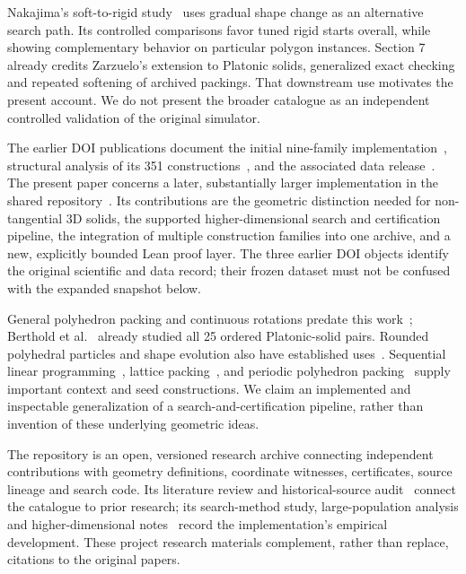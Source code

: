 \documentclass[11pt,a4paper]{article}
\begin{document}
Nakajima's soft-to-rigid study~\cite{nakajima2026} uses gradual shape change as an alternative search path. Its controlled comparisons favor tuned rigid starts overall, while showing complementary behavior on particular polygon instances. Section 7 already credits Zarzuelo's extension to Platonic solids, generalized exact checking and repeated softening of archived packings. That downstream use motivates the present account. We do not present the broader catalogue as an independent controlled validation of the original simulator.

The earlier DOI publications document the initial nine-family implementation~\cite{zarzueloMethods}, structural analysis of its 351 constructions~\cite{zarzueloPatterns}, and the associated data release~\cite{zarzueloData}. The present paper concerns a later, substantially larger implementation in the shared repository~\cite{archive}. Its contributions are the geometric distinction needed for non-tangential 3D solids, the supported higher-dimensional search and certification pipeline, the integration of multiple construction families into one archive, and a new, explicitly bounded Lean proof layer. The three earlier DOI objects identify the original scientific and data record; their frozen dataset must not be confused with the expanded snapshot below.

General polyhedron packing and continuous rotations predate this work~\cite{romanova2018}; Berthold et al.~\cite{berthold2026} already studied all 25 ordered Platonic-solid pairs. Rounded polyhedral particles and shape evolution also have established uses~\cite{jin2015}. Sequential linear programming~\cite{torquato2010}, lattice packing~\cite{betke2000}, and periodic polyhedron packing~\cite{torquato2009} supply important context and seed constructions. We claim an implemented and inspectable generalization of a search-and-certification pipeline, rather than invention of these underlying geometric ideas.

The repository is an open, versioned research archive connecting independent contributions with geometry definitions, coordinate witnesses, certificates, source lineage and search code. Its literature review and historical-source audit~\cite{repoRelated,repoAudit} connect the catalogue to prior research; its search-method study, large-population analysis and higher-dimensional notes~\cite{repoSearch,repoLarge,repoHigher} record the implementation's empirical development. These project research materials complement, rather than replace, citations to the original papers.
\end{document}
